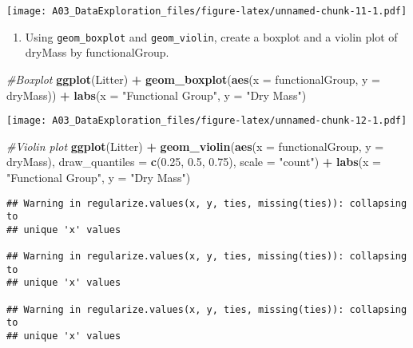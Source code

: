 \documentclass[]{article}
\newenvironment{Shaded}{\begin{snugshade}}{\end{snugshade}}
\newcommand{\CommentTok}[1]{\textcolor[rgb]{0.56,0.35,0.01}{\textit{#1}}}
\newcommand{\DataTypeTok}[1]{\textcolor[rgb]{0.13,0.29,0.53}{#1}}
\newcommand{\FloatTok}[1]{\textcolor[rgb]{0.00,0.00,0.81}{#1}}
\newcommand{\KeywordTok}[1]{\textcolor[rgb]{0.13,0.29,0.53}{\textbf{#1}}}
\newcommand{\NormalTok}[1]{#1}
\newcommand{\OperatorTok}[1]{\textcolor[rgb]{0.81,0.36,0.00}{\textbf{#1}}}
\newcommand{\StringTok}[1]{\textcolor[rgb]{0.31,0.60,0.02}{#1}}
\providecommand{\tightlist}{%
  \setlength{\itemsep}{0pt}\setlength{\parskip}{0pt}}
\begin{document}
\texttt{[image: A03\_DataExploration\_files/figure-latex/unnamed-chunk-11-1.pdf]}

\begin{enumerate}
\def\labelenumi{\arabic{enumi}.}
\setcounter{enumi}{14}
\tightlist
\item
  Using \texttt{geom\_boxplot} and \texttt{geom\_violin}, create a
  boxplot and a violin plot of dryMass by functionalGroup.
\end{enumerate}

\begin{Shaded}
\begin{Highlighting}[]
\CommentTok{#Boxplot}
\KeywordTok{ggplot}\NormalTok{(Litter) }\OperatorTok{+}
\StringTok{  }\KeywordTok{geom_boxplot}\NormalTok{(}\KeywordTok{aes}\NormalTok{(}\DataTypeTok{x =}\NormalTok{ functionalGroup, }\DataTypeTok{y =}\NormalTok{ dryMass)) }\OperatorTok{+}
\StringTok{  }\KeywordTok{labs}\NormalTok{(}\DataTypeTok{x =} \StringTok{"Functional Group"}\NormalTok{, }\DataTypeTok{y =} \StringTok{"Dry Mass"}\NormalTok{)}
\end{Highlighting}
\end{Shaded}

\texttt{[image: A03\_DataExploration\_files/figure-latex/unnamed-chunk-12-1.pdf]}

\begin{Shaded}
\begin{Highlighting}[]
\CommentTok{#Violin plot}
\KeywordTok{ggplot}\NormalTok{(Litter) }\OperatorTok{+}\StringTok{ }
\StringTok{  }\KeywordTok{geom_violin}\NormalTok{(}\KeywordTok{aes}\NormalTok{(}\DataTypeTok{x =}\NormalTok{ functionalGroup, }\DataTypeTok{y =}\NormalTok{ dryMass), }\DataTypeTok{draw_quantiles =} \KeywordTok{c}\NormalTok{(}\FloatTok{0.25}\NormalTok{, }\FloatTok{0.5}\NormalTok{, }\FloatTok{0.75}\NormalTok{), }\DataTypeTok{scale =} \StringTok{"count"}\NormalTok{) }\OperatorTok{+}\StringTok{ }
\StringTok{  }\KeywordTok{labs}\NormalTok{(}\DataTypeTok{x =} \StringTok{"Functional Group"}\NormalTok{, }\DataTypeTok{y =} \StringTok{"Dry Mass"}\NormalTok{)}
\end{Highlighting}
\end{Shaded}

\begin{verbatim}
## Warning in regularize.values(x, y, ties, missing(ties)): collapsing to
## unique 'x' values

## Warning in regularize.values(x, y, ties, missing(ties)): collapsing to
## unique 'x' values

## Warning in regularize.values(x, y, ties, missing(ties)): collapsing to
## unique 'x' values
\end{verbatim}
\end{document}
